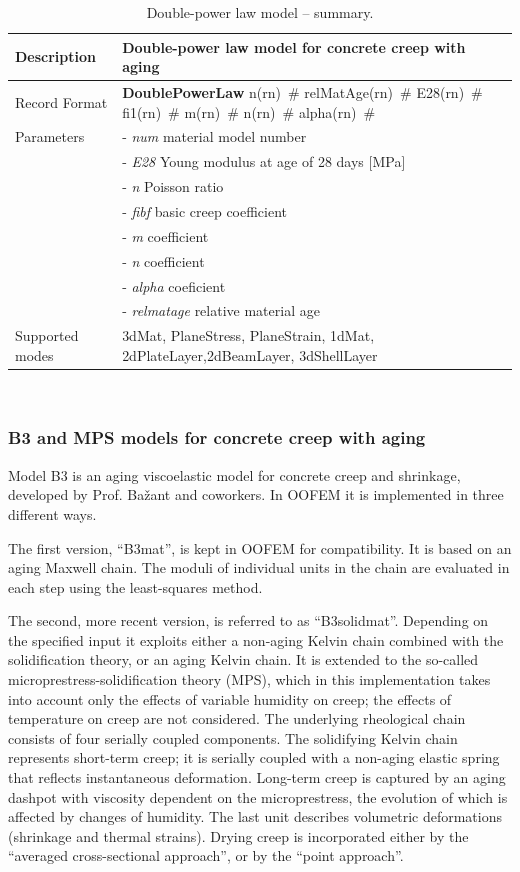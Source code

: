 \documentclass[a4paper]{article}
\newcommand{\descitem}[1]{{\noindent \bf #1}}
\newcommand{\elemparam}[2]{{{#1\tiny (#2)}~\#}}
\newcommand{\param}[1]{{\it #1}}
\newenvironment{mmt}{\begin{tabular}{|l|p{9cm}|}}{\end{tabular}\\}
\newenvironment{mmt}{\begin{tabular}{|l|l|}}{\end{tabular}\\}
\begin{document}
\begin{table}[!htb]
\begin{mmt}
\hline
Description & Double-power law model  for concrete creep with aging\\
\hline
Record Format & \descitem{DoublePowerLaw}  \elemparam{n}{rn}
\elemparam{relMatAge}{rn} \elemparam{E28}{rn} \elemparam{fi1}{rn} \elemparam{m}{rn}
\elemparam{n}{rn} \elemparam{alpha}{rn} \\
Parameters &- \param{num} material model number\\
&- \param{E28} Young modulus at age of 28 days [MPa]\\
&- \param{n} Poisson ratio\\
&- \param{fibf} basic creep coefficient\\
&- \param{m} coefficient \\
&- \param{n} coefficient \\
&- \param{alpha} coeficient \\
&- \param{relmatage} relative material age \\
Supported modes& 3dMat, PlaneStress, PlaneStrain, 1dMat,
2dPlateLayer,2dBeamLayer, 3dShellLayer\\
\hline
\end{mmt}
\caption{Double-power law model -- summary.}
\label{doublepowerlaw_table}
\end{table}

\subsubsection{B3 and MPS models for concrete creep with aging}

Model B3 is an aging viscoelastic model for concrete creep and shrinkage, developed by Prof. Ba\v{z}ant and coworkers. In OOFEM it is implemented in three different ways. 

The first version, ``B3mat'', is kept in OOFEM for compatibility. It is based on an aging Maxwell chain. The moduli of individual units in the chain are evaluated in each step using the least-squares method.

The second, more recent version, is referred to as ``B3solidmat''. Depending on the specified input it exploits either a non-aging Kelvin chain combined with the solidification theory, or an aging Kelvin chain. It is extended to the so-called microprestress-solidification theory (MPS), which in this implementation  takes into account only the effects of variable humidity on creep; the effects of temperature on creep are not considered. 
The underlying rheological chain consists of four serially coupled components. The solidifying Kelvin chain represents short-term creep; it is serially coupled with a non-aging elastic spring that reflects instantaneous deformation. Long-term creep is captured by an aging dashpot with viscosity dependent on the microprestress, the evolution of which is affected by changes of humidity. The last  unit describes volumetric deformations (shrinkage and thermal strains).
Drying creep is incorporated either by the 
``averaged cross-sectional approach'', or by the ``point approach''.
\end{document}
